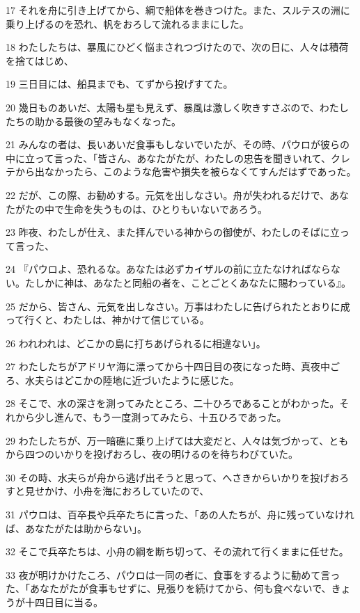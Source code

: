 \par 17 それを舟に引き上げてから、綱で船体を巻きつけた。また、スルテスの洲に乗り上げるのを恐れ、帆をおろして流れるままにした。
\par 18 わたしたちは、暴風にひどく悩まされつづけたので、次の日に、人々は積荷を捨てはじめ、
\par 19 三日目には、船具までも、てずから投げすてた。
\par 20 幾日ものあいだ、太陽も星も見えず、暴風は激しく吹きすさぶので、わたしたちの助かる最後の望みもなくなった。
\par 21 みんなの者は、長いあいだ食事もしないでいたが、その時、パウロが彼らの中に立って言った、「皆さん、あなたがたが、わたしの忠告を聞きいれて、クレテから出なかったら、このような危害や損失を被らなくてすんだはずであった。
\par 22 だが、この際、お勧めする。元気を出しなさい。舟が失われるだけで、あなたがたの中で生命を失うものは、ひとりもいないであろう。
\par 23 昨夜、わたしが仕え、また拝んでいる神からの御使が、わたしのそばに立って言った、
\par 24 『パウロよ、恐れるな。あなたは必ずカイザルの前に立たなければならない。たしかに神は、あなたと同船の者を、ことごとくあなたに賜わっている』。
\par 25 だから、皆さん、元気を出しなさい。万事はわたしに告げられたとおりに成って行くと、わたしは、神かけて信じている。
\par 26 われわれは、どこかの島に打ちあげられるに相違ない」。
\par 27 わたしたちがアドリヤ海に漂ってから十四日目の夜になった時、真夜中ごろ、水夫らはどこかの陸地に近づいたように感じた。
\par 28 そこで、水の深さを測ってみたところ、二十ひろであることがわかった。それから少し進んで、もう一度測ってみたら、十五ひろであった。
\par 29 わたしたちが、万一暗礁に乗り上げては大変だと、人々は気づかって、ともから四つのいかりを投げおろし、夜の明けるのを待ちわびていた。
\par 30 その時、水夫らが舟から逃げ出そうと思って、へさきからいかりを投げおろすと見せかけ、小舟を海におろしていたので、
\par 31 パウロは、百卒長や兵卒たちに言った、「あの人たちが、舟に残っていなければ、あなたがたは助からない」。
\par 32 そこで兵卒たちは、小舟の綱を断ち切って、その流れて行くままに任せた。
\par 33 夜が明けかけたころ、パウロは一同の者に、食事をするように勧めて言った、「あなたがたが食事もせずに、見張りを続けてから、何も食べないで、きょうが十四日目に当る。
